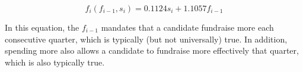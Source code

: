 \documentclass[11pt]{article}
\begin{document}
\begin{equation*}
f_i(f_{i-1}, s_i) = 0.1124s_i + 1.1057f_{i-1}
\end{equation*}

In this equation, the $f_{i-1}$ mandates that a candidate fundraise more each
consecutive quarter, which is typically (but not universally) true. In
addition, spending more also allows a candidate to fundraise more effectively
that quarter, which is also typically true.

\end{document}
